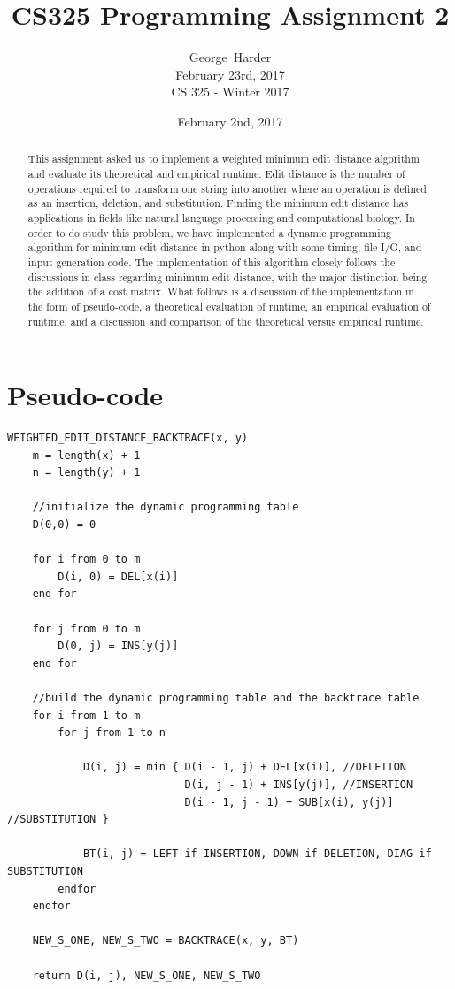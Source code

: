 \documentclass[10pt, onecolumn, draftclsnofoot, letterpaper, compsoc]{IEEEtran}
\title{CS325 Programming Assignment 2}
\date{February 2nd, 2017}
\author{George~Harder \\
		February 23rd, 2017 \\
		CS 325 - Winter 2017}
\begin{document}
\maketitle

\begin{abstract}

This assignment asked us to implement a weighted minimum edit distance algorithm and evaluate
its theoretical and empirical runtime. Edit distance is the number of operations
required to transform one string into another where an operation is defined as an insertion,
deletion, and substitution. Finding the minimum edit distance has applications in
fields like natural language processing and computational biology. In order to do
study this problem, we have implemented a dynamic programming algorithm for minimum
edit distance in python along with some timing, file I/O, and input generation code.
The implementation of this algorithm closely follows the discussions in class regarding
minimum edit distance, with the major distinction being the addition of a cost matrix.
What follows is a discussion of the implementation in the form of pseudo-code,
a theoretical evaluation of runtime, an empirical evaluation of runtime, and a
discussion and comparison of the theoretical versus empirical runtime.

\end{abstract}

\newpage

\section{Pseudo-code}

\begin{lstlisting}
WEIGHTED_EDIT_DISTANCE_BACKTRACE(x, y)
	m = length(x) + 1
	n = length(y) + 1

	//initialize the dynamic programming table
	D(0,0) = 0

	for i from 0 to m
		D(i, 0) = DEL[x(i)]
	end for

	for j from 0 to m
		D(0, j) = INS[y(j)]
	end for

	//build the dynamic programming table and the backtrace table
	for i from 1 to m
		for j from 1 to n

			D(i, j) = min { D(i - 1, j) + DEL[x(i)], //DELETION
                        	D(i, j - 1) + INS[y(j)], //INSERTION
                        	D(i - 1, j - 1) + SUB[x(i), y(j)] //SUBSTITUTION }

			BT(i, j) = LEFT if INSERTION, DOWN if DELETION, DIAG if SUBSTITUTION
		endfor
	endfor

	NEW_S_ONE, NEW_S_TWO = BACKTRACE(x, y, BT)

	return D(i, j), NEW_S_ONE, NEW_S_TWO
\end{lstlisting}
\end{document}
